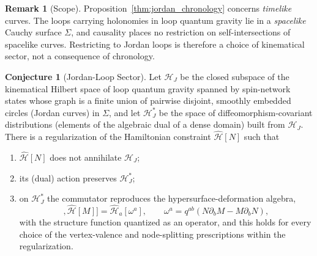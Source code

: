 \documentclass[11pt,a4paper,reqno]{amsart}
\theoremstyle{definition}
\newtheorem{remark}[theorem]{Remark}
\newtheorem{conjecture}[theorem]{Conjecture}
\numberwithin{equation}{section}
\begin{document}
\begin{remark}[Scope]
Proposition~\ref{thm:jordan_chronology} concerns \emph{timelike} curves. The loops carrying holonomies in loop quantum gravity lie in a \emph{spacelike} Cauchy surface $\Sigma$, and causality places no restriction on self-intersections of spacelike curves. Restricting to Jordan loops is therefore a choice of kinematical sector, not a consequence of chronology.
\end{remark}

\begin{conjecture}[Jordan-Loop Sector]
\label{conj:jordan_sector}
Let $\mathscr{H}_J$ be the closed subspace of the kinematical Hilbert space of loop quantum gravity spanned by spin-network states whose graph is a finite union of pairwise disjoint, smoothly embedded circles (Jordan curves) in $\Sigma$, and let $\mathscr{H}_J^\ast$ be the space of diffeomorphism-covariant distributions (elements of the algebraic dual of a dense domain) built from $\mathscr{H}_J$. There is a regularization of the Hamiltonian constraint $\widehat{\mathcal{H}}[N]$ such that
\begin{enumerate}[label=(\alph*)]
    \item $\widehat{\mathcal{H}}[N]$ does not annihilate $\mathscr{H}_J$;
    \item its (dual) action preserves $\mathscr{H}_J^\ast$;
    \item on $\mathscr{H}_J^\ast$ the commutator reproduces the hypersurface-deformation algebra,
    \begin{equation}
    [\widehat{\mathcal{H}}[N], \widehat{\mathcal{H}}[M]] = \widehat{\mathcal{H}}_a[\omega^a], \qquad \omega^a = q^{ab}(N\partial_b M - M\partial_b N),
    \end{equation}
    with the structure function quantized as an operator, and this holds for every choice of the vertex-valence and node-splitting prescriptions within the regularization.
\end{enumerate}
\end{conjecture}
\end{document}
